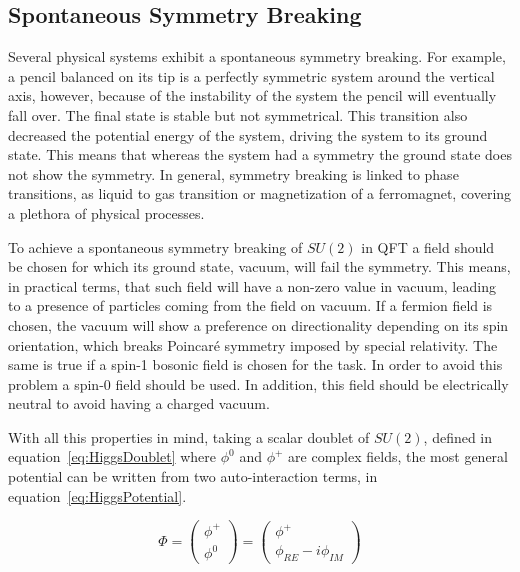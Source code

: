 \subsection{Spontaneous Symmetry Breaking}
\label{sec:SSB}

Several physical systems exhibit a spontaneous symmetry breaking. For example, a pencil balanced on its tip is a perfectly symmetric system around the vertical axis, however, because of the instability of the system the pencil will eventually fall over. The final state is stable but not symmetrical. This transition also decreased the potential energy of the system, driving the system to its ground state. This means that whereas the system had a symmetry the ground state does not show the symmetry. In general, symmetry breaking is linked to phase transitions, as liquid to gas transition or magnetization of a ferromagnet, covering a plethora of physical processes. %

To achieve a spontaneous symmetry breaking of $SU(2)$ in QFT a field should be chosen for which its ground state, vacuum, will fail the symmetry. This means, in practical terms, that such field will have a non-zero value in vacuum, leading to a presence of particles coming from the field on vacuum. If a fermion field is chosen, the vacuum will show a preference on directionality depending on its spin orientation, which breaks Poincar\'{e} symmetry imposed by special relativity. The same is true if a spin-1 bosonic field is chosen for the task. In order to avoid this problem a spin-0 field should be used. In addition, this field should be electrically neutral to avoid having a charged vacuum.

With all this properties in mind, taking a scalar doublet of $SU(2)$, defined in equation~\ref{eq:HiggsDoublet} where $\phi^{0}$ and $\phi^{+}$ are complex fields, the most general potential can be written from two auto-interaction terms, in equation~\ref{eq:HiggsPotential}.

\begin{equation}
  \label{eq:HiggsDoublet}
  \Phi=\left(
    \begin{array}{c}
      \phi^{+} \\
      \phi^{0}
    \end{array}
  \right)=\left(
    \begin{array}{c}
      \phi^{+} \\
      \phi_{RE}-i\phi_{IM}
    \end{array}
  \right)
\end{equation}

